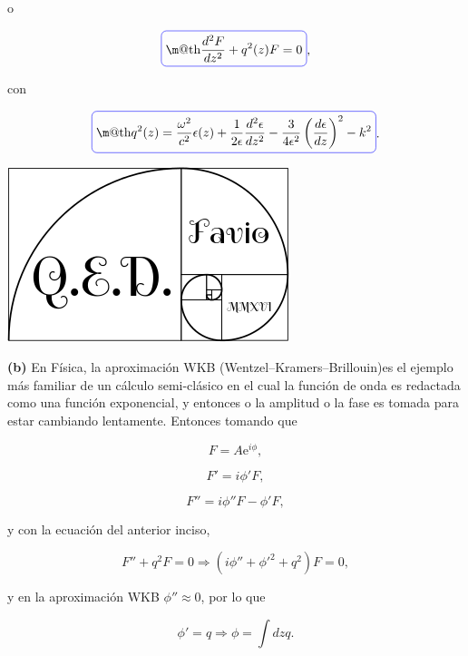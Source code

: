 \documentclass[a4paper,11pt]{article}
\makeatletter
\numberwithin{equation}{section}
\newcommand*{\boxcolor}{blue}
\renewcommand{\boxed}[1]{\textcolor{\boxcolor}{%
\tikz[baseline={([yshift=-1ex]current bounding box.center)}] \node [rectangle, minimum width=1ex,rounded corners,draw] {\normalcolor\m@th$\displaystyle#1$};}}
\newcommand{\euler}{\mathrm{e}}
\makeatother
\begin{document}
o 

\begin{equation}
 \boxed{\frac{d^2 F}{dz^2} + q^2(z) F = 0},
\end{equation}

con

\begin{equation}
  \boxed{q^2(z) =\frac{\omega^2}{c^2} \epsilon(z) + \frac{1}{2\epsilon}\frac{d^2 \epsilon}{dz^2} 
 - \frac{3}{4\epsilon^2}\left(\frac{d \epsilon}{d z} \right)^2 - k^2}.
\end{equation}

\hspace{10cm}\includegraphics[scale=0.25]{logoQED}

\textbf{(b)} En Física, la aproximación WKB (Wentzel–Kramers–Brillouin)es el 
ejemplo más familiar de un cálculo semi-clásico en el cual la función de onda es 
redactada como una función exponencial, y entonces o la amplitud o la fase es
tomada para estar cambiando lentamente. Entonces tomando que 

\begin{equation}
 F = A \euler^{i\phi},
\end{equation}

\begin{equation}
 F' = i \phi' F,
\end{equation}

\begin{equation}
 F'' = i \phi'' F - \phi' F,
\end{equation}

y con la ecuación del anterior inciso, 

\begin{equation}
 F'' + q^2 F = 0 \Rightarrow (i\phi'' + \phi'^2 + q^2) F = 0,
\end{equation}

y en la aproximación WKB $\phi'' \approx 0$, por lo que 

\begin{equation}
 \phi' = q \Rightarrow \phi = \int dz q.
\end{equation}
\end{document}
